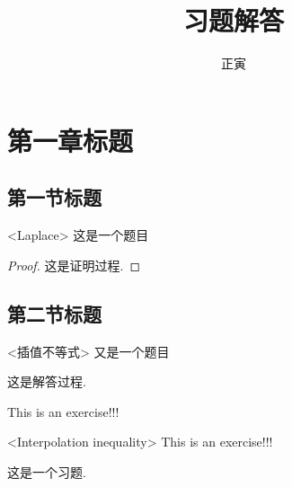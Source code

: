 \documentclass[withinsec,chinese]{mathexercise}
\title{习题解答}
\author{正寅}
\begin{document}
\maketitle

\chapter{第一章标题}

\section{第一节标题}

\begin{exercise}[2]<Laplace>
    这是一个题目
\end{exercise}

\begin{proof}
  这是证明过程.
\end{proof}


\section{第二节标题}

\begin{exercise}<插值不等式>
    又是一个题目
\end{exercise}

\begin{solution}
  这是解答过程.
\end{solution}

\begin{exercise}
    This is an exercise!!!
\end{exercise}

\begin{exercise}<Interpolation inequality>
    This is an exercise!!!
\end{exercise}

\begin{exercise}[11]
    这是一个习题.
\end{exercise}
\end{document}
